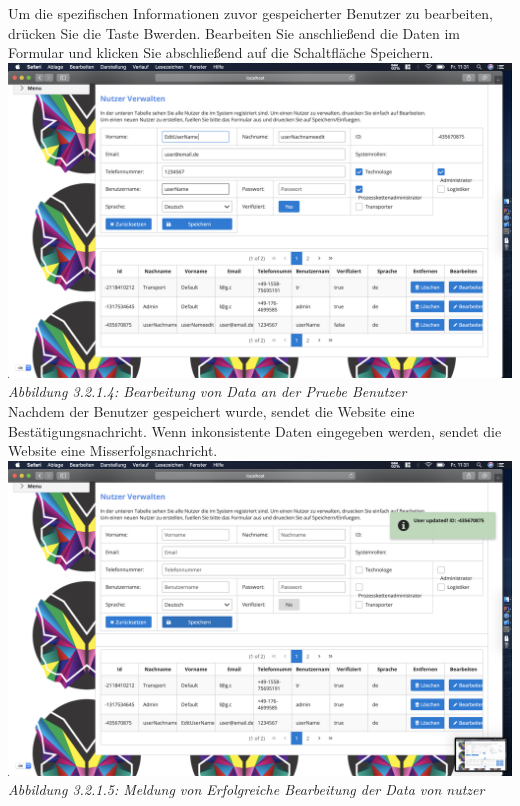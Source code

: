 \documentclass[enabledeprecatedfontcommands,fontsize=12pt,paper=a4,twoside]{scrartcl}
\begin{document}
Um die spezifischen Informationen zuvor gespeicherter Benutzer zu bearbeiten, drücken Sie die Taste Bwerden. Bearbeiten Sie anschließend die Daten im Formular und klicken Sie abschließend auf die Schaltfläche Speichern.
\hypertarget{sc3.1.2.4}{
\includegraphics[width=1\textwidth]{Screenshots/UserEditData.png}
\textit{Abbildung 3.2.1.4: Bearbeitung von Data an der Pruebe Benutzer}
} \\
Nachdem der Benutzer gespeichert wurde, sendet die Website eine Bestätigungsnachricht. Wenn inkonsistente Daten eingegeben werden, sendet die Website eine Misserfolgsnachricht.
\hypertarget{sc3.1.2.5}{
\includegraphics[width=1\textwidth]{Screenshots/editMeldung.png}
\textit{Abbildung 3.2.1.5: Meldung von Erfolgreiche Bearbeitung der Data von nutzer}
} \\
\end{document}
